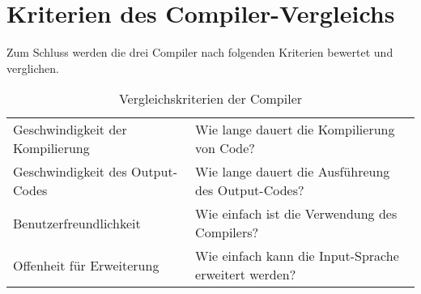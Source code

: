 \section{Kriterien des Compiler-Vergleichs} \label{sec:Vergleichs_Kriterien}
Zum Schluss werden die drei Compiler nach folgenden Kriterien bewertet und verglichen.

\begin{table}[H]
    \centering
    \caption{Vergleichskriterien der Compiler}
    \vspace{3mm} %

    \begin{tabular}{l|l}
    Geschwindigkeit der Kompilierung    & Wie lange dauert die Kompilierung von Code?                       \\
    Geschwindigkeit des Output-Codes    & Wie lange dauert die Ausführeung des Output-Codes?                \\
    Benutzerfreundlichkeit              & Wie einfach ist die Verwendung des Compilers?                     \\
    Offenheit für Erweiterung           & Wie einfach kann die Input-Sprache erweitert werden?                                 
    \end{tabular}
\end{table}


